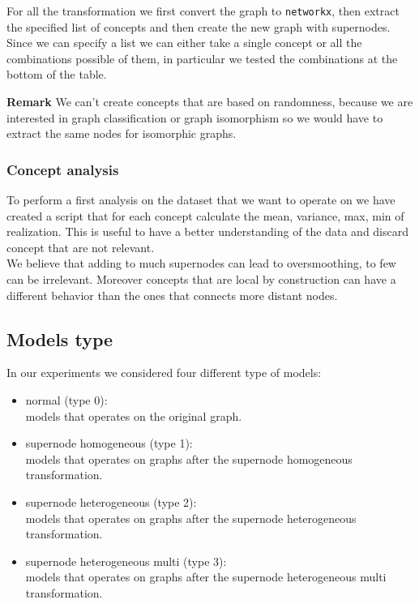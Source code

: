 \documentclass[twoside,11pt]{article}
\begin{document}
\noindent
For all the transformation we first convert the graph to \texttt{networkx}, then extract the specified list of concepts and then create the new graph with supernodes. Since we can specify a list we can either take a single concept or all the combinations possible of them, in particular we tested the combinations at the bottom of the table.

\noindent
{\bf Remark}
{
We can't create concepts that are based on randomness, because we are interested in graph classification or graph isomorphism so we would have to extract the same nodes for isomorphic graphs.
}\\



\subsubsection{Concept analysis} %
\label{sec:concept_analysis}
To perform a first analysis on the dataset that we want to operate on we have created a script that for each concept calculate the mean, variance, max, min of realization. This is useful to have a better understanding of the data and discard concept that are not relevant.\\
We believe that adding to much supernodes can lead to oversmoothing, to few can be irrelevant. Moreover concepts that are local by construction can have a different behavior than the ones that connects more distant nodes.



\subsection{Models type} %
\label{sub:models_type}
In our experiments we considered four different type of models:
\begin{itemize}
    \item normal (type 0): \\
        models that operates on the original graph.
    \item supernode homogeneous (type 1): \\
        models that operates on graphs after the supernode homogeneous transformation.
    \item supernode heterogeneous (type 2): \\
        models that operates on graphs after the supernode heterogeneous transformation.
    \item supernode heterogeneous multi (type 3): \\
        models that operates on graphs after the supernode heterogeneous multi transformation.
\end{itemize}
\end{document}
